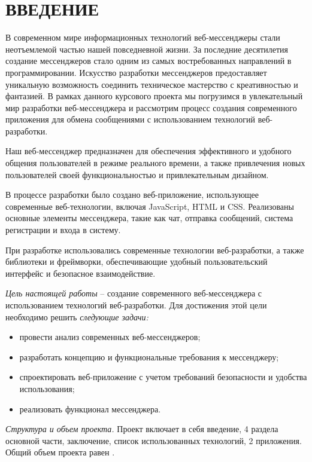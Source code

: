 \section*{ВВЕДЕНИЕ}


В современном мире информационных технологий веб-мессенджеры стали неотъемлемой частью нашей повседневной жизни. За последние десятилетия создание мессенджеров стало одним из самых востребованных направлений в программировании. Искусство разработки мессенджеров предоставляет уникальную возможность соединить техническое мастерство с креативностью и фантазией. В рамках данного курсового проекта мы погрузимся в увлекательный мир разработки веб-мессенджера и рассмотрим процесс создания современного приложения для обмена сообщениями с использованием технологий веб-разработки.

Наш веб-мессенджер предназначен для обеспечения эффективного и удобного общения пользователей в режиме реального времени, а также привлечения новых пользователей своей функциональностью и привлекательным дизайном.

В процессе разработки было создано веб-приложение, использующее современные веб-технологии, включая JavaScript, HTML и CSS. Реализованы основные элементы мессенджера, такие как чат, отправка сообщений, система регистрации и входа в систему.

При разработке использовались современные технологии веб-разработки, а также библиотеки и фреймворки, обеспечивающие удобный пользовательский интерфейс и безопасное взаимодействие.


\emph{Цель настоящей работы} –  создание современного веб-мессенджера с использованием технологий веб-разработки. Для достижения этой цели необходимо решить \emph{следующие задачи:}
\begin{itemize}
	\item провести анализ современных веб-мессенджеров;
	\item разработать концепцию и функциональные требования к мессенджеру;
	\item спроектировать веб-приложение с учетом требований безопасности и удобства использования;
	\item реализовать функционал мессенджера.
\end{itemize}

\emph{Структура и объем проекта.} Проект включает в себя введение, 4 раздела основной части, заключение, список использованных технологий, 2 приложения. Общий объем проекта равен .

